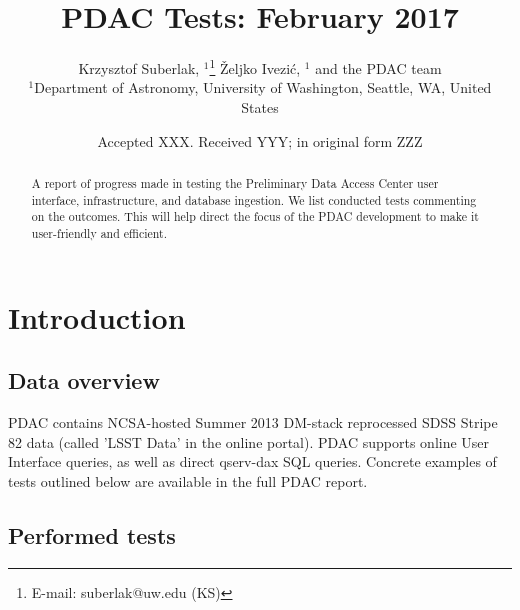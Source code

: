 \documentclass[fleqn,usenatbib, onecolumn]{mnras} %
\title[PDAC progress]{PDAC Tests: February 2017}
\author[K. Suberlak et al. ]{
Krzysztof Suberlak, $^{1}$\thanks{E-mail: suberlak@uw.edu (KS)}
\v{Z}eljko Ivezi\'c, $^{1}$ and the PDAC team  
\\
$^{1}$Department of Astronomy, University of Washington, Seattle, WA, United States\\
}
\date{Accepted XXX. Received YYY; in original form ZZZ}
\begin{document}
\label{firstpage}
\pagerange{\pageref{firstpage}--\pageref{lastpage}}
\maketitle

\begin{abstract}
A report of progress made in testing the Preliminary Data Access Center user interface, infrastructure, and database ingestion.  We list conducted tests commenting on the outcomes. This will help direct the focus of the PDAC development to make it user-friendly and efficient. 
\end{abstract}




\section*{Introduction}

\subsection*{Data overview}
PDAC contains NCSA-hosted Summer 2013 DM-stack reprocessed SDSS Stripe 82 data (called 'LSST Data' in the online portal). PDAC supports online User Interface queries, as well as direct  qserv-dax SQL queries. Concrete examples of tests outlined below are available in the full PDAC report.  

\subsection*{Performed tests}
\end{document}
